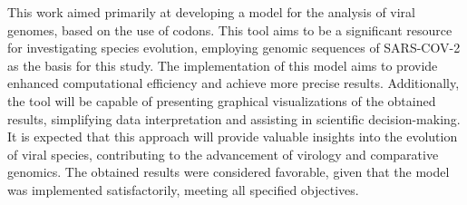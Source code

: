 This work aimed primarily at developing a model for the analysis of viral genomes, based on the use of codons. This tool aims to be a significant resource for investigating species evolution, employing genomic sequences of SARS-COV-2 as the basis for this study. The implementation of this model aims to provide enhanced computational efficiency and achieve more precise results. Additionally, the tool will be capable of presenting graphical visualizations of the obtained results, simplifying data interpretation and assisting in scientific decision-making. It is expected that this approach will provide valuable insights into the evolution of viral species, contributing to the advancement of virology and comparative genomics. The obtained results were considered favorable, given that the model was implemented satisfactorily, meeting all specified objectives.

